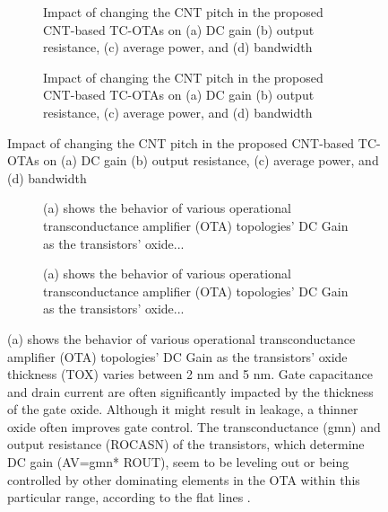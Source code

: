 \begin{figure}[htbp]
  \centering
  \begin{subfigure}[b]{0.48\linewidth}
    \centering
    \caption{Impact of changing the CNT pitch in the proposed CNT-based TC-OTAs on (a) DC gain (b) output resistance, (c) average power, and (d) bandwidth}

  \end{subfigure}
  \hfill
  \begin{subfigure}[b]{0.48\linewidth}
    \centering
    \caption{Impact of changing the CNT pitch in the proposed CNT-based TC-OTAs on (a) DC gain (b) output resistance, (c) average power, and (d) bandwidth}

  \end{subfigure}
  \caption{Impact of changing the CNT pitch in the proposed CNT-based TC-OTAs on (a) DC gain (b) output resistance, (c) average power, and (d) bandwidth}

  \label{fig:group_eb2xz}
\end{figure}

\begin{figure}[htbp]
  \centering
  \begin{subfigure}[b]{0.48\linewidth}
    \centering
    \caption{(a) shows the behavior of various operational transconductance amplifier (OTA) topologies' DC Gain as the transistors' oxide...}

  \end{subfigure}
  \hfill
  \begin{subfigure}[b]{0.48\linewidth}
    \centering
    \caption{(a) shows the behavior of various operational transconductance amplifier (OTA) topologies' DC Gain as the transistors' oxide...}

  \end{subfigure}
  \caption{(a) shows the behavior of various operational transconductance amplifier (OTA) topologies' DC Gain as the transistors' oxide thickness (TOX) varies between 2 nm and 5 nm. Gate capacitance and drain current are often significantly impacted by the thickness of the gate oxide. Although it might result in leakage, a thinner oxide often improves gate control. The transconductance (gmn) and output resistance (ROCASN) of the transistors, which determine DC gain (AV=gmn* ROUT), seem to be leveling out or being controlled by other dominating elements in the OTA within this particular range, according to the flat lines \cite{ref7,ref39}.}

  \label{fig:group_y7snq}
\end{figure}

